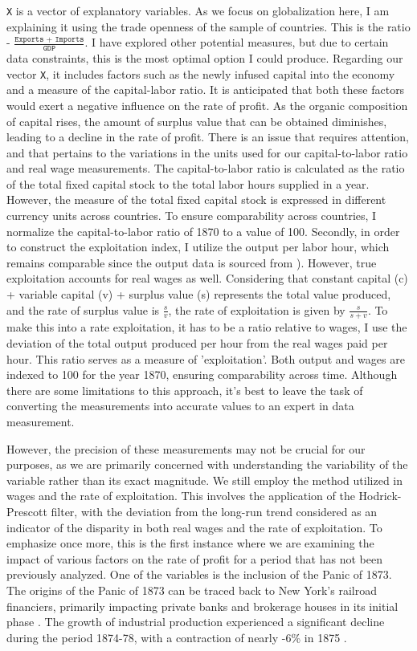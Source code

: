 \documentclass[10pt]{article}
\begin{document}
\texttt{X} is a vector of explanatory variables. As we focus on globalization here, I am explaining it using the trade openness of the sample of countries. This is the ratio - $\frac{\texttt{Exports + Imports}}{\texttt{GDP}}$. I have explored other potential measures, but due to certain data constraints, this is the most optimal option I could produce. Regarding our vector \texttt{X}, it includes factors such as the newly infused capital into the economy and a measure of the capital-labor ratio. It is anticipated that both these factors would exert a negative influence on the rate of profit. As the organic composition of capital rises, the amount of surplus value that can be obtained diminishes, leading to a decline in the rate of profit. There is an issue that requires attention, and that pertains to the variations in the units used for our capital-to-labor ratio and real wage measurements. The capital-to-labor ratio is calculated as the ratio of the total fixed capital stock to the total labor hours supplied in a year. However, the measure of the total fixed capital stock is expressed in different currency units across countries. To ensure comparability across countries, I normalize the capital-to-labor ratio of 1870 to a value of 100. Secondly, in order to construct the exploitation index, I utilize the output per labor hour, which remains comparable since the output data is sourced from \citet{Maddison2010}). However, true exploitation accounts for real wages as well. Considering that constant capital (c) + variable capital (v) + surplus value (s) represents the total value produced, and the rate of surplus value is $\frac{s}{v}$, the rate of exploitation is given by $\frac{s}{s+v}$. To make this into a rate exploitation, it has to be a ratio relative to wages, I use the deviation of the total output produced per hour from the real wages paid per hour. This ratio serves as a measure of 'exploitation'. Both output and wages are indexed to 100 for the year 1870, ensuring comparability across time. Although there are some limitations to this approach, it's best to leave the task of converting the measurements into accurate values to an expert in data measurement. \par However, the precision of these measurements may not be crucial for our purposes, as we are primarily concerned with understanding the variability of the variable rather than its exact magnitude. We still employ the method utilized in \citet{BasuManolakos2013} wages and the rate of exploitation. This involves the application of the Hodrick-Prescott filter, with the deviation from the long-run trend considered as an indicator of the disparity in both real wages and the rate of exploitation. To emphasize once more, this is the first instance where we are examining the impact of various factors on the rate of profit for a period that has not been previously analyzed. One of the variables is the inclusion of the Panic of 1873. The origins of the Panic of 1873 can be traced back to New York's railroad financiers, primarily impacting private banks and brokerage houses in its initial phase \citep{Wicker2006}. The growth of industrial production experienced a significant decline during the period 1874-78, with a contraction of nearly -6\% in 1875 \citep{Hilt2018}. 
\end{document}
